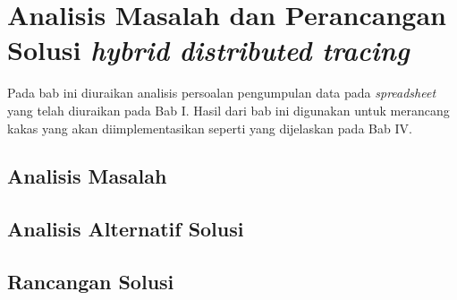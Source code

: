 \chapter{Analisis Masalah dan Perancangan Solusi \textit{hybrid distributed tracing}}

Pada bab ini diuraikan analisis persoalan pengumpulan data pada \textit{spreadsheet} yang telah diuraikan pada Bab I. Hasil dari bab ini digunakan untuk merancang kakas yang akan diimplementasikan seperti yang dijelaskan pada Bab IV.


\section{Analisis Masalah}

\section{Analisis Alternatif Solusi}

\section{Rancangan Solusi}